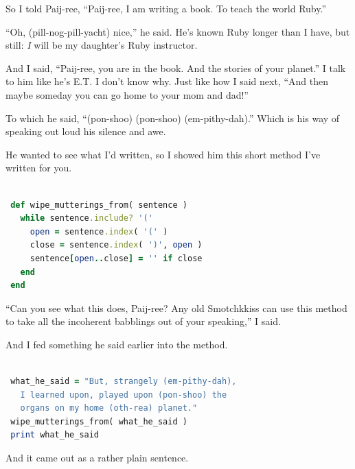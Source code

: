 \documentclass[10pt,twoside]{report}
\begin{document}
So I told Paij-ree, ``Paij-ree, I am writing a book.  To teach the
world Ruby.''

``Oh, (pill-nog-pill-yacht) nice,'' he said.  He's known Ruby longer
than I have, but still: {\em I} will be my daughter's Ruby instructor.

And I said, ``Paij-ree, you are in the book.  And the stories of your
planet.''  I talk to him like he's E.T.  I don't know why.  Just like
how I said next, ``And then maybe someday you can go home to your mom
and dad!''

To which he said, ``(pon-shoo) (pon-shoo) (em-pithy-dah).''  Which is
his way of speaking out loud his silence and awe.

He wanted to see what I'd written, so I showed him this short method
I've written for you.


\begin{lstlisting}[basicstyle=\ttfamily\color{basiccolor},
    commentstyle = \ttfamily\color{commentcolor},
    keywordstyle=\ttfamily\color{keywordscolor},
    stringstyle=\color{stringcolor},
    language=Ruby,
    basicstyle=\small\ttfamily,
    showstringspaces=false,
  ]

 def wipe_mutterings_from( sentence )
   while sentence.include? '('
     open = sentence.index( '(' )
     close = sentence.index( ')', open )
     sentence[open..close] = '' if close
   end
 end

\end{lstlisting}


``Can you see what this does, Paij-ree?  Any old Smotchkkiss can use
this method to take all the incoherent babblings out of your
speaking,'' I said.

And I fed something he said earlier into the method.


\begin{lstlisting}[basicstyle=\ttfamily\color{basiccolor},
    commentstyle = \ttfamily\color{commentcolor},
    keywordstyle=\ttfamily\color{keywordscolor},
    stringstyle=\color{stringcolor},
    language=Ruby,
    basicstyle=\small\ttfamily,
    showstringspaces=false,
  ]

 what_he_said = "But, strangely (em-pithy-dah),
   I learned upon, played upon (pon-shoo) the
   organs on my home (oth-rea) planet."
 wipe_mutterings_from( what_he_said )
 print what_he_said

\end{lstlisting}


And it came out as a rather plain sentence.
\end{document}
